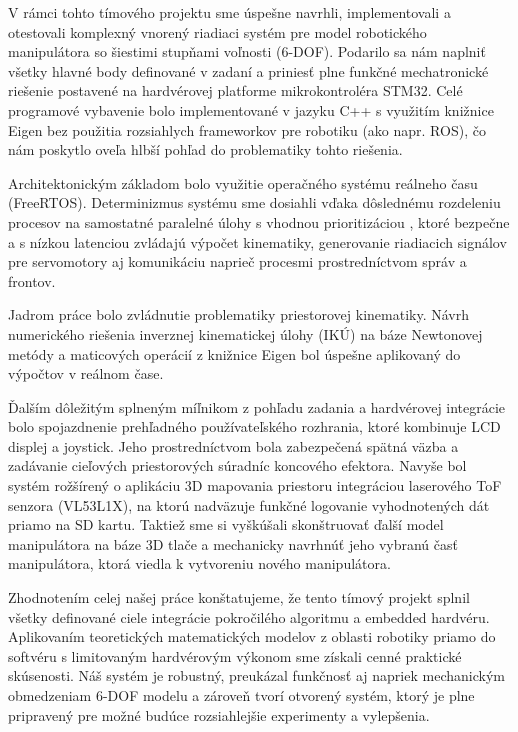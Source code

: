 V rámci tohto tímového projektu sme úspešne navrhli, implementovali a 
otestovali komplexný vnorený riadiaci systém pre model robotického 
manipulátora so šiestimi stupňami voľnosti (6-DOF). Podarilo sa nám 
naplniť všetky hlavné body definované v zadaní a priniesť plne funkčné 
mechatronické riešenie postavené na hardvérovej platforme mikrokontroléra 
STM32. Celé programové vybavenie bolo implementované v jazyku C++ s využitím
knižnice Eigen bez 
použitia rozsiahlych frameworkov pre robotiku (ako napr. ROS), čo nám 
poskytlo oveľa hlbší pohľad do problematiky tohto riešenia.

Architektonickým základom bolo využitie operačného systému reálneho času 
(FreeRTOS). Determinizmus systému sme dosiahli vďaka dôslednému rozdeleniu
 procesov na samostatné paralelné úlohy s vhodnou prioritizáciou
 , ktoré bezpečne a s nízkou 
 latenciou zvládajú výpočet kinematiky, generovanie riadiacich signálov 
 pre servomotory aj komunikáciu naprieč procesmi prostredníctvom správ a 
 frontov.

Jadrom práce bolo zvládnutie problematiky 
priestorovej kinematiky. Návrh numerického riešenia inverznej kinematickej 
úlohy (IKÚ) na báze Newtonovej metódy a maticových operácií z knižnice 
Eigen bol úspešne aplikovaný do výpočtov v reálnom čase.

Ďalším dôležitým splneným míľnikom z pohľadu zadania a hardvérovej 
integrácie bolo spojazdnenie prehľadného používateľského rozhrania, 
ktoré kombinuje LCD displej a joystick. Jeho prostredníctvom bola 
zabezpečená spätná väzba a zadávanie cieľových priestorových 
súradníc koncového efektora. Navyše bol systém rožšírený o aplikáciu 
3D mapovania priestoru integráciou laserového ToF senzora (VL53L1X), na 
ktorú nadväzuje funkčné logovanie vyhodnotených dát priamo na SD kartu.
Taktiež sme si vyškúšali skonštruovať ďalší model manipulátora na 
báze 3D tlače a mechanicky navrhnúť jeho vybranú 
časť manipulátora, ktorá viedla k vytvoreniu nového manipulátora.

Zhodnotením celej našej práce konštatujeme, že tento tímový projekt splnil 
všetky definované ciele integrácie pokročilého algoritmu a embedded 
hardvéru. Aplikovaním teoretických matematických modelov z oblasti robotiky 
priamo do softvéru s limitovaným hardvérovým výkonom sme získali cenné 
praktické skúsenosti. Náš systém je robustný, preukázal funkčnosť aj 
napriek mechanickým obmedzeniam 6-DOF modelu a zároveň tvorí otvorený 
systém, ktorý je plne pripravený pre možné budúce rozsiahlejšie experimenty 
a vylepšenia.
